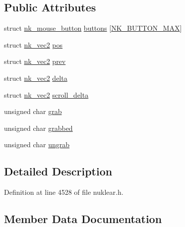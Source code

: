 \subsection*{Public Attributes}
\begin{DoxyCompactItemize}
\item 
struct \mbox{\hyperlink{structnk__mouse__button}{nk\+\_\+mouse\+\_\+button}} \mbox{\hyperlink{structnk__mouse_a08d6933b4a6d87555cd0d3514f0507fc}{buttons}} \mbox{[}\mbox{\hyperlink{nuklear_8h_a393c070a7578ce148c1d341d412d556eaac3699df21301900b13e7408b75be8dd}{N\+K\+\_\+\+B\+U\+T\+T\+O\+N\+\_\+\+M\+AX}}\mbox{]}
\item 
struct \mbox{\hyperlink{structnk__vec2}{nk\+\_\+vec2}} \mbox{\hyperlink{structnk__mouse_a07c094826e58d6d56af36b61ec91cc9a}{pos}}
\item 
struct \mbox{\hyperlink{structnk__vec2}{nk\+\_\+vec2}} \mbox{\hyperlink{structnk__mouse_ae9bfaf081795f248ee28ff73e0e7510b}{prev}}
\item 
struct \mbox{\hyperlink{structnk__vec2}{nk\+\_\+vec2}} \mbox{\hyperlink{structnk__mouse_ad51017f1b2ab199b892e454ec8f6e970}{delta}}
\item 
struct \mbox{\hyperlink{structnk__vec2}{nk\+\_\+vec2}} \mbox{\hyperlink{structnk__mouse_a73dd665a6eca9bc85763a6148f0ff459}{scroll\+\_\+delta}}
\item 
unsigned char \mbox{\hyperlink{structnk__mouse_a93b114f1d129ce336d0d237980337ac9}{grab}}
\item 
unsigned char \mbox{\hyperlink{structnk__mouse_a498f60d6bf88ca50aacbddcb2a2032ad}{grabbed}}
\item 
unsigned char \mbox{\hyperlink{structnk__mouse_a3420ca85bb04a09dd14694dfb394c7f0}{ungrab}}
\end{DoxyCompactItemize}


\subsection{Detailed Description}


Definition at line 4528 of file nuklear.\+h.



\subsection{Member Data Documentation}
\mbox{\label{structnk__mouse_a08d6933b4a6d87555cd0d3514f0507fc}} 
